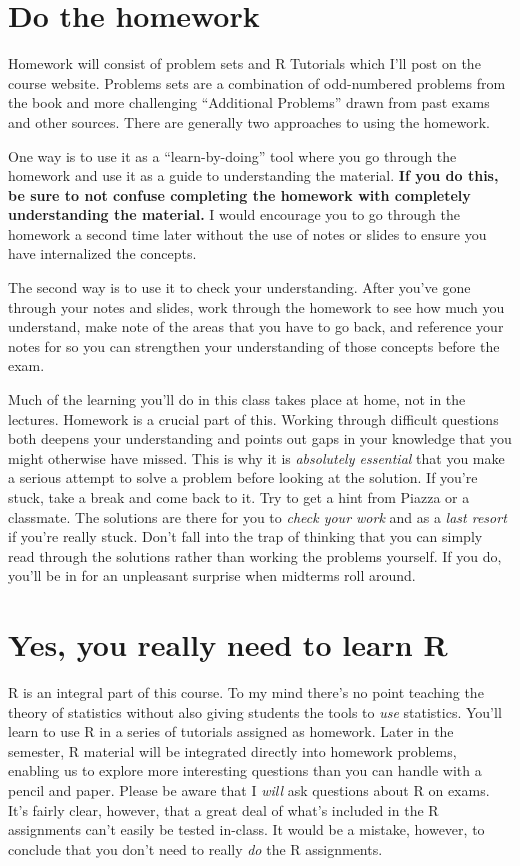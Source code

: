\documentclass[12pt,letterpaper]{article}
\begin{document}
\section{Do the homework}
Homework will consist of problem sets and R Tutorials which I'll post on the course website. Problems sets are a combination of odd-numbered problems from the book and more challenging ``Additional Problems'' drawn from past exams and other sources. There are generally two approaches to using the homework. 

One way is to use it as a ``learn-by-doing'' tool where you go through the homework and use it as a guide to understanding the material. \textbf{If you do this, be sure to not confuse completing the homework with completely understanding the material.} I would encourage you to go through the homework a second time later without the use of notes or slides to ensure you have internalized the concepts. 

The second way is to use it to check your understanding. After you've gone through your notes and slides, work through the homework to see how much you understand, make note of the areas that you have to go back, and reference your notes for so you can strengthen your understanding of those concepts before the exam.

Much of the learning you'll do in this class takes place at home, not in the lectures. Homework is a crucial part of this. Working through difficult questions both deepens your understanding and points out gaps in your knowledge that you might otherwise have missed. This is why it is \emph{absolutely essential} that you make a serious attempt to solve a problem before looking at the solution.
If you're stuck, take a break and come back to it. Try to get a hint from Piazza or a classmate.
The solutions are there for you to \emph{check your work} and as a \emph{last resort} if you're really stuck. Don't fall into the trap of thinking that you can simply read through the solutions rather than working the problems yourself. If you do, you'll be in for an unpleasant surprise when midterms roll around.

\section{Yes, you really need to learn R}
R is an integral part of this course. To my mind there's no point teaching the theory of statistics without also giving students the tools to \emph{use} statistics. You'll learn to use R in a series of tutorials assigned as homework. Later in the semester, R material will be integrated directly into homework problems, enabling us to explore more interesting questions than you can handle with a pencil and paper.  Please be aware that I \emph{will} ask questions about R on exams. It's fairly clear, however, that a great deal of what's included in the R assignments can't easily be tested in-class. It would be a mistake, however, to conclude that you don't need to really \emph{do} the R assignments. 
\end{document}
